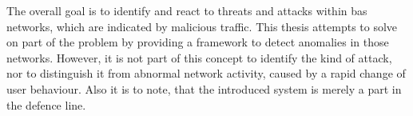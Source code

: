 The overall goal is to identify and react to threats and attacks within \gls{bas} networks, which are indicated by malicious traffic.
This thesis attempts to solve on part of the problem by providing a framework to detect anomalies in those networks.
However, it is not part of this concept to identify the kind of attack, nor to distinguish it from abnormal network activity, caused by a rapid change of user behaviour.
Also it is to note, that the introduced system is merely a part in the defence line.

